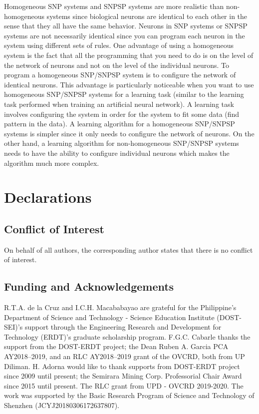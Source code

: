 \documentclass[smallextended]{svjour3}
\begin{document}
Homogeneous SNP systems and SNPSP systems are more realistic than non-homogeneous systems since 
biological neurons are identical to each other in the sense that they all have the same behavior.
Neurons in SNP systems or SNPSP systems are not necessarily identical since you can program each
neuron in the system using different sets of rules. One advantage of using a homogeneous system is
the fact that all the programming that you need to do is on the level of the  network of neurons and 
not on the level of the individual neurons. To program a homogeneous SNP/SNPSP system is to 
configure the network of identical neurons. This advantage is particularly noticeable when you want 
to use homogeneous SNP/SNPSP systems for a learning task (similar to the learning task performed 
when training an artificial neural network). A learning task involves configuring the system in 
order for the system to fit some data (find pattern in the data). A learning algorithm for a 
homogeneous SNP/SNPSP systems is simpler since it only needs to configure the network of neurons.
On the other hand, a learning algorithm for non-homogeneous SNP/SNPSP systems needs to have the
ability to configure individual neurons which makes the algorithm much more complex.  

 


\section*{Declarations}

\subsection*{Conflict of Interest}
On behalf of all authors, the corresponding author states that there is no conflict of interest.

\subsection*{Funding and Acknowledgements}
R.T.A. de la Cruz and I.C.H. Macababayao  are grateful for the Philippine's Department of Science and Technology - Science Education Institute (DOST-SEI)'s support 
through the Engineering Research and Development for Technology (ERDT)'s graduate scholarship program.
F.G.C. Cabarle thanks the support from the DOST-ERDT project; the Dean Ruben A. Garcia PCA AY2018--2019, and an RLC AY2018--2019 grant of the OVCRD, both from UP Diliman.
H. Adorna would like to thank supports from DOST-ERDT project since 2009 until present; the Semirara Mining Corp. Professorial Chair Award since 2015 until present. The RLC  grant from UPD - OVCRD 2019-2020.
The work was supported by the Basic Research Program of Science and Technology of Shenzhen (JCYJ20180306172637807).




\end{document}
